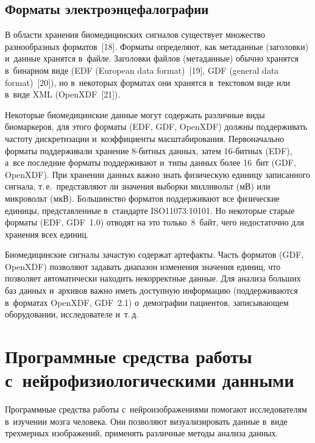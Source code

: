 \begin{multicols}{2}
\vspace*{-4pt}
    
\subsection{Форматы электроэнцефалографии}


    В области хранения биомедицинских сигналов существует множество 
разнообразных форматов~[18]. Форматы определяют, как метаданные 
(заголовки) и~данные хранятся в~файле. Заголовки файлов (метаданные) 
обычно хранятся в~бинарном виде (EDF (European data format)~[19], 
GDF (general data format)~[20]), но в~некоторых 
форматах они хранятся в~текстовом виде или в~виде XML (OpenXDF~[21]). 
    
    Некоторые биомедицинские данные могут содержать различные виды 
биомаркеров, для этого форматы (EDF, GDF, OpenXDF) должны 
поддерживать частоту дискретизации и~коэффициенты масштабирования. 
Первоначально форматы поддерживали хранение 8-бит\-ных данных, затем  
16-бит\-ных (EDF), а~все последние форматы поддерживают и~типы данных 
более 16~бит (GDF, OpenXDF). При хранении данных важно знать 
физическую единицу записанного сигнала, т.\,е.\ представляют ли значения 
выборки милливольт (мВ) или микровольт (мкВ). Большинство форматов 
поддерживают все физические единицы, представленные в~стандарте 
ISO11073:10101. Но некоторые старые форматы (EDF, GDF~1.0) отводят на 
это только~8~байт, чего недостаточно для хранения всех единиц.
    
    Биомедицинские сигналы зачастую содержат артефакты. Часть 
форматов (GDF, OpenXDF) позволяют задавать диапазон изменения значения 
единиц, что позволяет автоматически находить некорректные данные. Для 
анализа больших баз данных и~архивов важно иметь доступную информацию 
(поддерживаются в~форматах OpenXDF, GDF~2.1) о~демографии пациентов, 
записывающем оборудовании, исследователе и~т.\,д.

\vspace*{-4pt}
    
\section{Программные средства работы с~нейрофизиологическими 
данными}

\vspace*{-4pt}

    Программные средства работы с~нейроизображениями помогают 
исследователям в~изучении мозга человека. Они позволяют визуализировать 
данные в~виде трехмерных изображений, применять различные методы 
анализа данных. 
    

\end{multicols}
